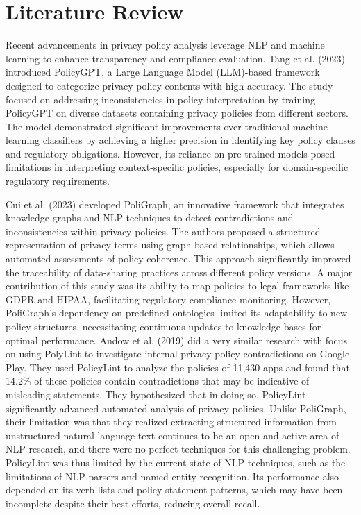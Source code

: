 \documentclass[conference]{IEEEtran}
\begin{document}
\section{Literature Review}

    Recent advancements in privacy policy analysis leverage NLP and machine learning to enhance transparency and compliance evaluation. Tang et al. (2023)\cite{tang_policygpt_2023} introduced PolicyGPT, a Large Language Model (LLM)-based framework designed to categorize privacy policy contents with high accuracy. The study focused on addressing inconsistencies in policy interpretation by training PolicyGPT on diverse datasets containing privacy policies from different sectors. The model demonstrated significant improvements over traditional machine learning classifiers by achieving a higher precision in identifying key policy clauses and regulatory obligations. However, its reliance on pre-trained models posed limitations in interpreting context-specific policies, especially for domain-specific regulatory requirements.

Cui et al. (2023)\cite{cui_poligraph_nodate} developed PoliGraph, an innovative framework that integrates knowledge graphs and NLP techniques to detect contradictions and inconsistencies within privacy policies. The authors proposed a structured representation of privacy terms using graph-based relationships, which allows automated assessments of policy coherence. This approach significantly improved the traceability of data-sharing practices across different policy versions. A major contribution of this study was its ability to map policies to legal frameworks like GDPR and HIPAA, facilitating regulatory compliance monitoring. However, PoliGraph's dependency on predefined ontologies limited its adaptability to new policy structures, necessitating continuous updates to knowledge bases for optimal performance. Andow et al. (2019)\cite{andow_policylint_nodate} did a very similar research with focus on using PolyLint to investigate internal privacy policy contradictions on Google Play. 
They used PolicyLint to analyze the policies of 11,430 apps and found that 14.2\% of these policies contain contradictions that may be indicative of misleading statements. They hypothesized that in doing so, PolicyLint significantly advanced automated analysis of privacy policies. Unlike PoliGraph, their limitation was that they realized extracting structured information from unstructured natural language text continues to be an open and active area of NLP research, and there were no perfect techniques for this challenging problem. PolicyLint was thus limited by the current state of NLP techniques, such as the limitations of NLP parsers and named-entity recognition. Its performance also depended on its verb lists and policy statement patterns, which may have been incomplete despite their best efforts, reducing overall recall. 
\end{document}
